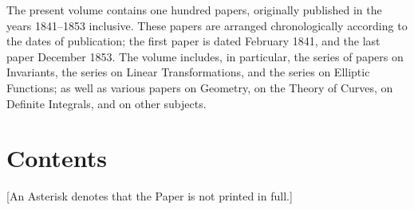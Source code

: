 \documentclass[11pt,a4paper]{book}
\theoremstyle{plain}
\theoremstyle{definition}
\theoremstyle{remark}
\begin{document}
The present volume contains one hundred papers, originally published in the years 1841--1853 inclusive. These papers are arranged chronologically according to the dates of publication; the first paper is dated February 1841, and the last paper December 1853. The volume includes, in particular, the series of papers on Invariants, the series on Linear Transformations, and the series on Elliptic Functions; as well as various papers on Geometry, on the Theory of Curves, on Definite Integrals, and on other subjects.

\cleardoublepage

\chapter*{Contents}

{\small [An Asterisk denotes that the Paper is not printed in full.]}
\end{document}
